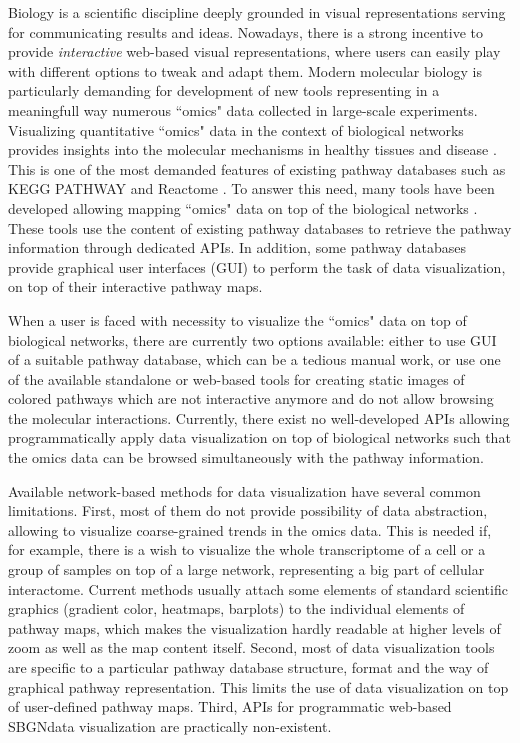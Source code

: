 \documentclass[a4,center,fleqn]{NAR}
\begin{document}
Biology is a scientific discipline deeply grounded in visual representations serving for communicating results and ideas. Nowadays, there is a strong incentive to provide \emph{interactive} web-based visual representations, where users can easily play with different options to tweak and adapt them. Modern molecular biology is particularly demanding for development of new tools representing in a meaningfull way numerous ``omics" data collected in large-scale experiments. Visualizing quantitative ``omics" data in the context of biological networks provides insights into the molecular mechanisms in healthy tissues and disease \cite{Gehlenborg2010,Barillot2012}. This is one of the most demanded features of existing pathway databases such as KEGG PATHWAY and Reactome \cite{Kanehisa2012, Croft2014}. To answer this need, many tools have been developed allowing mapping ``omics" data on top of the biological networks \cite{Arakawa2005,vanIersel2008,Luo2013, Nishida2014}. These tools use the content of existing pathway databases to retrieve the pathway information through dedicated APIs. In addition, some pathway databases provide graphical user interfaces (GUI) to perform the task of data visualization, on top of their interactive pathway maps.

When a user is faced with necessity to visualize the ``omics" data on top of biological networks, there are currently two options available: either to use GUI of a suitable pathway database, which can be a tedious manual work, or use one of the available standalone or web-based tools for creating static images of colored pathways which are not interactive anymore and do not allow browsing the molecular interactions. Currently, there exist no well-developed APIs allowing programmatically apply data visualization on top of biological networks such that the omics data can be browsed simultaneously with the pathway information.

Available network-based methods for data visualization have several common limitations. First, most of them do not provide possibility of data abstraction, allowing to visualize coarse-grained trends in the omics data. This is needed if, for example, there is a wish to visualize the whole transcriptome of a cell or a group of samples on top of a large network, representing a big part of cellular interactome. Current methods usually attach some elements of standard scientific graphics (gradient color, heatmaps, barplots) to the individual elements of pathway maps, which makes the visualization hardly readable at higher levels of zoom as well as the map content itself. Second, most of data visualization tools are specific to a particular pathway database structure, format and the way of graphical pathway representation. This limits the use of data visualization on top of user-defined pathway maps. Third, APIs for programmatic web-based SBGNdata visualization are practically non-existent.
\end{document}
